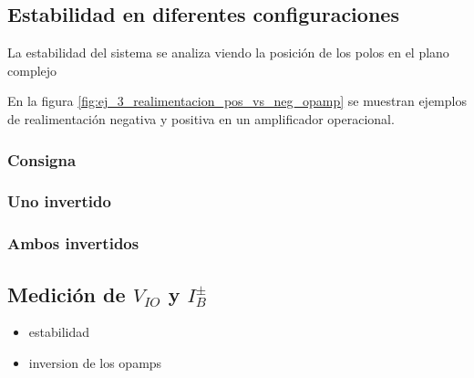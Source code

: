 \documentclass[../../main.tex]{subfiles}
\begin{document}
\subsection{Estabilidad en diferentes configuraciones}




La estabilidad del sistema se analiza viendo la posici\'on de los polos en el plano complejo


En la figura \ref{fig:ej_3_realimentacion_pos_vs_neg_opamp} se muestran ejemplos de realimentaci\'on negativa y positiva en un amplificador operacional.



\subsubsection{Consigna}
\subsubsection{Uno invertido}
\subsubsection{Ambos invertidos}












\subsection{Medici\'on de $V_{IO}$ y $I_B^\pm$}


\begin{itemize}
	\item estabilidad
	\item inversion de los opamps
\end{itemize}
\end{document}
